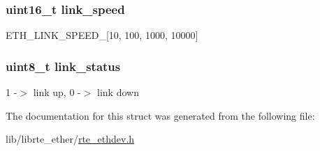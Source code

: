 \subsubsection[{link\+\_\+speed}]{\setlength{\rightskip}{0pt plus 5cm}uint16\+\_\+t link\+\_\+speed}\label{structrte__eth__link_a7d93770cafbfd72bb3bbd1aaec9894ab}
E\+T\+H\+\_\+\+L\+I\+N\+K\+\_\+\+S\+P\+E\+E\+D\+\_\+\mbox{[}10, 100, 1000, 10000\mbox{]} \hypertarget{structrte__eth__link_a81eeab45998a64b609a5fcf8435bdad1}{}
\subsubsection[{link\+\_\+status}]{\setlength{\rightskip}{0pt plus 5cm}uint8\+\_\+t link\+\_\+status}\label{structrte__eth__link_a81eeab45998a64b609a5fcf8435bdad1}
1 -\/$>$ link up, 0 -\/$>$ link down 

The documentation for this struct was generated from the following file\+:\begin{DoxyCompactItemize}
\item 
lib/librte\+\_\+ether/\hyperlink{rte__ethdev_8h}{rte\+\_\+ethdev.\+h}\end{DoxyCompactItemize}
